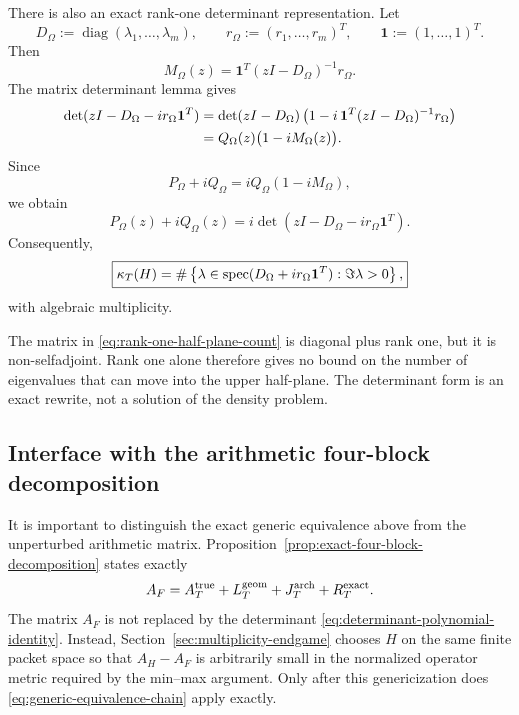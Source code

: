 There is also an exact rank-one determinant representation.  Let
\[
D_\Omega:=\operatorname{diag}(\lambda_1,\dots,\lambda_m),
\qquad
r_\Omega:=(r_1,\dots,r_m)^T,
\qquad
\mathbf 1:=(1,\dots,1)^T.
\]
Then
\[
M_\Omega(z)
=
\mathbf 1^T(zI-D_\Omega)^{-1}r_\Omega.
\]
The matrix determinant lemma gives
\begin{align}
\det(zI-D_\Omega-i r_\Omega\mathbf1^T)
&=
\det(zI-D_\Omega)
\left(
1-i\,\mathbf1^T(zI-D_\Omega)^{-1}r_\Omega
\right)
\notag\\
&=
Q_\Omega(z)\bigl(1-iM_\Omega(z)\bigr).
\label{eq:determinant-lemma-Omega}
\end{align}
Since
\[
P_\Omega+iQ_\Omega
=
iQ_\Omega(1-iM_\Omega),
\]
we obtain
\begin{equation}
\boxed{
P_\Omega(z)+iQ_\Omega(z)
=
i\det(zI-D_\Omega-i r_\Omega\mathbf1^T).
}
\label{eq:determinant-polynomial-identity}
\end{equation}
Consequently,
\begin{equation}
\boxed{
\kappa_T(H)
=
\#\left\{
\lambda\in\operatorname{spec}(D_\Omega+i r_\Omega\mathbf1^T):
\Im\lambda>0
\right\},
}
\label{eq:rank-one-half-plane-count}
\end{equation}
with algebraic multiplicity.

The matrix in \eqref{eq:rank-one-half-plane-count} is diagonal plus rank one,
but it is non-selfadjoint.  Rank one alone therefore gives no bound on the
number of eigenvalues that can move into the upper half-plane.  The
determinant form is an exact rewrite, not a solution of the density problem.

\subsection{Interface with the arithmetic four-block decomposition}

It is important to distinguish the exact generic equivalence above from the
unperturbed arithmetic matrix.  Proposition~\ref{prop:exact-four-block-decomposition}
states exactly
\begin{equation}
A_F
=
A_T^{\rm true}
+L_T^{\rm geom}
+J_T^{\rm arch}
+R_T^{\rm exact}.
\label{eq:four-block-restated-negative-square-section}
\end{equation}
The matrix $A_F$ is not replaced by the determinant
\eqref{eq:determinant-polynomial-identity}.  Instead, Section~\ref{sec:multiplicity-endgame}
chooses $H$ on the same finite packet space so that $A_H-A_F$ is arbitrarily
small in the normalized operator metric required by the min--max argument.
Only after this genericization does
\eqref{eq:generic-equivalence-chain} apply exactly.

